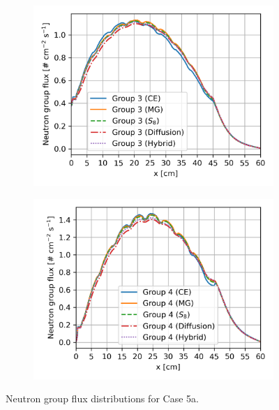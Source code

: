 \begin{frame}
\begin{figure}[htb!]
\begin{subfigure}[t]{.35\textwidth}
      \centering
      \includegraphics[width=\textwidth]{../images/case-5a-group-3-flux}
      \label{fig:c5ag3}
    \end{subfigure}
    \begin{subfigure}[t]{.35\textwidth}
      \centering
      \includegraphics[width=\textwidth]{../images/case-5a-group-4-flux}
      \label{fig:c5ag4}
    \end{subfigure}
    \caption{Neutron group flux distributions for Case 5a.}
    \label{fig:c5aflux}
  \end{figure}
\end{frame}


